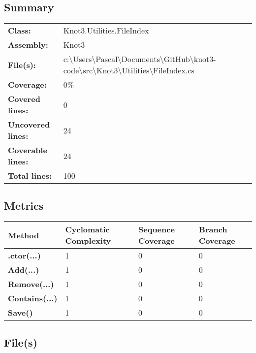 \documentclass[a4paper,10pt]{article}
\begin{document}
\subsection{Summary}
\begin{longtable}[l]{ll}
\textbf{Class:} & Knot3.Utilities.FileIndex\\
\textbf{Assembly:} & Knot3\\
\textbf{File(s):} & \begin{minipage}[t]{12cm}{c:\textbackslash Users\textbackslash Pascal\textbackslash Documents\textbackslash GitHub\textbackslash knot3-code\textbackslash src\textbackslash Knot3\textbackslash Utilities\textbackslash FileIndex.cs}\end{minipage} \\
\textbf{Coverage:} & 0\%\\
\textbf{Covered lines:} & 0\\
\textbf{Uncovered lines:} & 24\\
\textbf{Coverable lines:} & 24\\
\textbf{Total lines:} & 100\\
\end{longtable}
\subsection{Metrics}
\begin{longtable}[l]{|l|l|l|l|}
\hline
\textbf{Method} & \textbf{Cyclomatic Complexity} & \textbf{Sequence Coverage} & \textbf{Branch Coverage}\\
\hline
\textbf{.ctor(...)} & 1 & 0 & 0\\
\hline
\textbf{Add(...)} & 1 & 0 & 0\\
\hline
\textbf{Remove(...)} & 1 & 0 & 0\\
\hline
\textbf{Contains(...)} & 1 & 0 & 0\\
\hline
\textbf{Save()} & 1 & 0 & 0\\
\hline
\end{longtable}
\subsection{File(s)}
\end{document}
